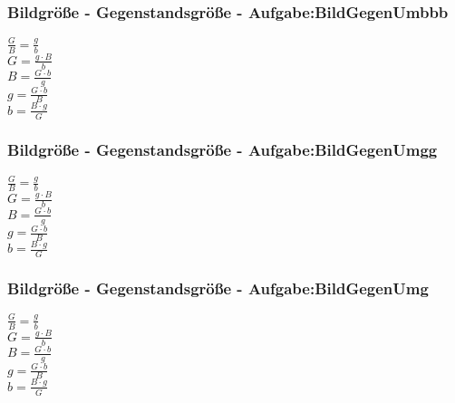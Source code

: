 \subsubsection{Bildgröße - Gegenstandsgröße - Aufgabe:BildGegenUmbbb} 
\begin{minipage}{0.45\textwidth} 
$ \frac{G}{B} = \frac{g}{b} $\\ 
$ G = \frac{g\cdot B}{ b} $\\ 
$ B = \frac{G\cdot b}{ g} $\\ 
$ g = \frac{G\cdot b}{ B} $\\ 
$ b = \frac{B\cdot g}{ G} $\\ 
\end{minipage} 
\begin{minipage}{0.45\textwidth} 
 
\end{minipage} 
\subsubsection{Bildgröße - Gegenstandsgröße - Aufgabe:BildGegenUmgg} 
\begin{minipage}{0.45\textwidth} 
$ \frac{G}{B} = \frac{g}{b} $\\ 
$ G = \frac{g\cdot B}{ b} $\\ 
$ B = \frac{G\cdot b}{ g} $\\ 
$ g = \frac{G\cdot b}{ B} $\\ 
$ b = \frac{B\cdot g}{ G} $\\ 
\end{minipage} 
\begin{minipage}{0.45\textwidth} 
 
\end{minipage} 
\subsubsection{Bildgröße - Gegenstandsgröße - Aufgabe:BildGegenUmg} 
\begin{minipage}{0.45\textwidth} 
$ \frac{G}{B} = \frac{g}{b} $\\ 
$ G = \frac{g\cdot B}{ b} $\\ 
$ B = \frac{G\cdot b}{ g} $\\ 
$ g = \frac{G\cdot b}{ B} $\\ 
$ b = \frac{B\cdot g}{ G} $\\ 
\end{minipage} 
\begin{minipage}{0.45\textwidth} 
 
\end{minipage} 
